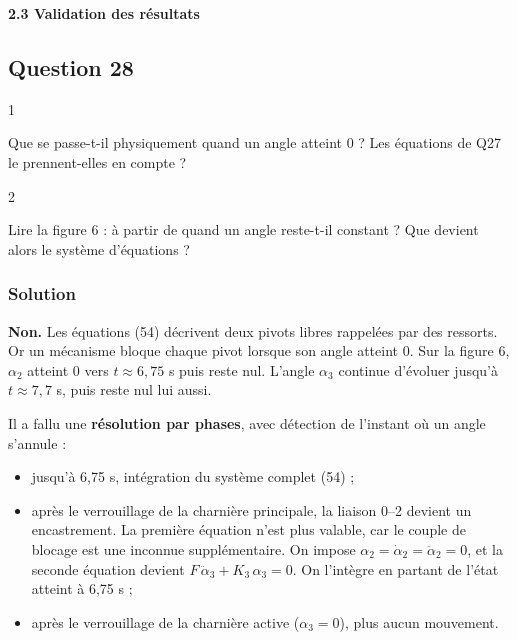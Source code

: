 \documentclass[11pt,a4paper]{article}
\providecommand{\tightlist}{\setlength{\itemsep}{0pt}\setlength{\parskip}{0pt}}
\begin{document}
\textbf{2.3 Validation des résultats}

\hypertarget{question-28}{%
\subsection{Question 28}\label{question-28}}

\begin{indication}{1}

Que se passe-t-il physiquement quand un angle atteint 0 ? Les équations de Q27 le prennent-elles en compte ?

\end{indication}

\begin{indication}{2}

Lire la figure 6 : à partir de quand un angle reste-t-il constant ? Que devient alors le système d'équations ?

\end{indication}

\hypertarget{solution-27}{%
\subsubsection{Solution}\label{solution-27}}

\textbf{Non.} Les équations (54) décrivent deux pivots libres rappelées par des ressorts. Or un mécanisme bloque chaque pivot lorsque son angle atteint 0. Sur la figure 6, \(\alpha_2\) atteint 0 vers \(t\approx6{,}75\) s puis reste nul. L'angle \(\alpha_3\) continue d'évoluer jusqu'à \(t\approx7{,}7\) s, puis reste nul lui aussi.

Il a fallu une \textbf{résolution par phases}, avec détection de l'instant où un angle s'annule :

\begin{itemize}
\tightlist
\item
  jusqu'à 6,75 s, intégration du système complet (54) ;
\item
  après le verrouillage de la charnière principale, la liaison 0--2 devient un encastrement. La première équation n'est plus valable, car le couple de blocage est une inconnue supplémentaire. On impose \(\alpha_2=\dot\alpha_2=\ddot\alpha_2=0\), et la seconde équation devient \(F\,\ddot\alpha_3+K_3\,\alpha_3=0\). On l'intègre en partant de l'état atteint à 6,75 s ;
\item
  après le verrouillage de la charnière active (\(\alpha_3=0\)), plus aucun mouvement.
\end{itemize}
\end{document}
